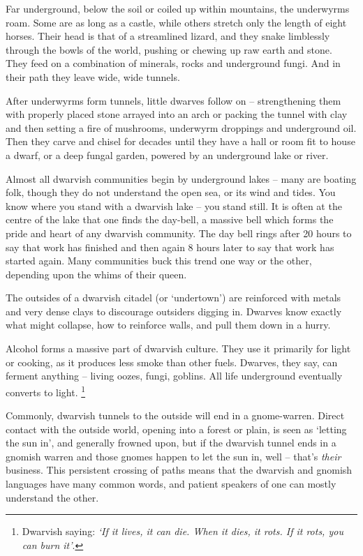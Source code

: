 \label{dwarvishHomes}
\renewcommand\npcsymbol{\Dw}

\noindent
Far underground, below the soil or coiled up within mountains, the underwyrms roam.
Some are as long as a castle, while others stretch only the length of eight horses.
Their head is that of a streamlined lizard, and they snake limblessly through the bowls of the world, pushing or chewing up raw earth and stone.
They feed on a combination of minerals, rocks and underground fungi.
And in their path they leave wide, wide tunnels.

After underwyrms form tunnels, little dwarves follow on -- strengthening them with properly placed stone arrayed into an arch or packing the tunnel with clay and then setting a fire of mushrooms, underwyrm droppings and underground oil. Then they carve and chisel for decades until they have a hall or room fit to house a dwarf, or a deep fungal garden, powered by an underground lake or river.

Almost all dwarvish communities begin by underground lakes -- many are boating folk, though they do not understand the open sea, or its wind and tides. You know where you stand with a dwarvish lake -- you stand still. It is often at the centre of the lake that one finds the day-bell, a massive bell which forms the pride and heart of any dwarvish community. The day bell rings after 20 hours to say that work has finished and then again 8 hours later to say that work has started again. Many communities buck this trend one way or the other, depending upon the whims of their queen.

The outsides of a dwarvish citadel (or `undertown') are reinforced with metals and very dense clays to discourage outsiders digging in.
Dwarves know exactly what might collapse, how to reinforce walls, and pull them down in a hurry.

Alcohol forms a massive part of dwarvish culture.
They use it primarily for light or cooking, as it produces less smoke than other fuels.
Dwarves, they say, can ferment anything -- living oozes, fungi, goblins.
All life underground eventually converts to light.%
\footnote{Dwarvish saying: \textit{`If it lives, it can die. When it dies, it rots. If it rots, you can burn it'}.}

Commonly, dwarvish tunnels to the outside will end in a gnome-warren.
Direct contact with the outside world, opening into a forest or plain, is seen as `letting the sun in',
and generally frowned upon, but if the dwarvish tunnel ends in a gnomish warren and those gnomes happen to let the sun in, well -- that's \emph{their} business.
This persistent crossing of paths means that the dwarvish and gnomish languages have many common words, and patient speakers of one can mostly understand the other.


